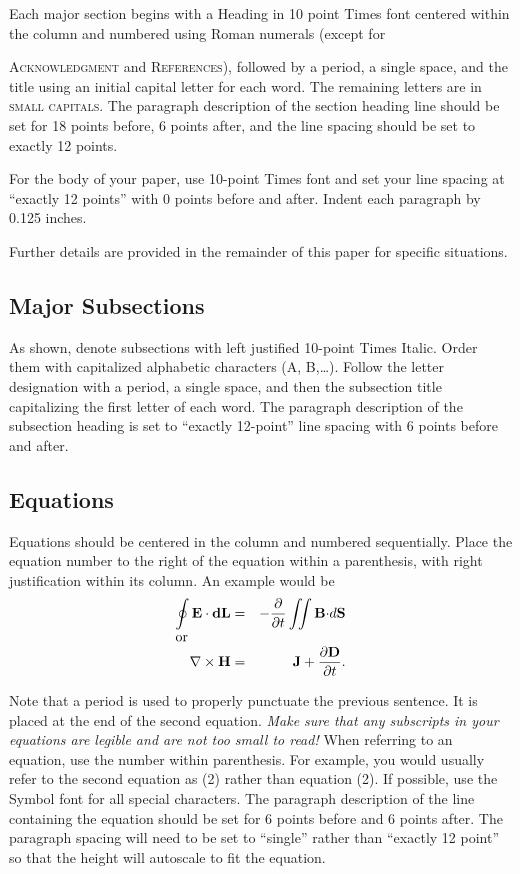 \documentclass[conference]{IEEEtran}
\begin{document}
Each major section begins with a Heading in 10 point Times font centered within the column and numbered using Roman numerals (except for {{\scshape Acknowledgment} and {\scshape References}), followed by a period, a single space, and the title using an initial capital letter for each word. The remaining letters are in {\scshape small capitals}. The paragraph description of the section heading line should be set for 18 points before, 6 points after, and the line spacing should be set to exactly 12 points.

For the body of your paper, use 10-point Times font and set your line spacing at ``exactly 12 points'' with 0 points before and after. Indent each paragraph by 0.125 inches.

Further details are provided in the remainder of this paper for specific situations.
\subsection{ Major Subsections}
As shown, denote subsections with left justified 10-point Times
Italic. Order them with capitalized alphabetic characters (A, B,\dots ). Follow the letter designation with a period, a single space, and then the subsection title capitalizing the first letter of each word. The paragraph description of the subsection heading is set to ``exactly
12-point'' line spacing with 6 points before and after.
\subsection{ Equations }
Equations should be centered in the column and numbered sequentially. Place the equation number to the right of the equation within a parenthesis, with right justification within its column. An example would be
\begin{eqnarray}
\oint {\bf E \cdot dL} & = & - {\partial\over \partial t}
\int\!\!\!\int {\bf B \cdot} d {\bf S}\\
\noalign{\hbox{or}}
\nabla \times {\bf H} & = & {\bf J} + {\partial {\bf D} \over \partial t}.
\end{eqnarray}

Note that a period is used to properly punctuate the previous
sentence. It is placed at the end of the second equation. {\itshape Make sure
that any subscripts in your equations are legible and are not too
small to read!} When referring to an equation, use the number within
parenthesis. For example, you would usually refer to the second
equation as (2) rather than equation (2). If possible, use the Symbol
font for all special characters.%
The paragraph description of the line containing the
equation should be set for 6 points before and 6 points after. The
paragraph spacing will need to be set to ``single'' rather than ``exactly
12 point'' so that the height will autoscale to fit the equation.

}
\end{document}
